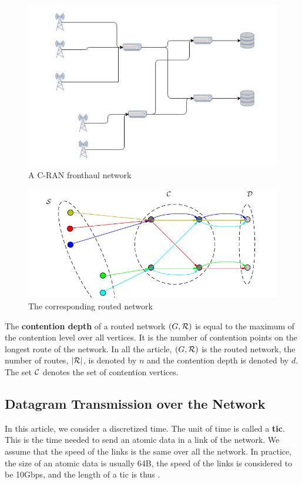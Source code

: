 \documentclass[english]{article}
\begin{document}
	\begin{figure}[h]
	\centering
	\includegraphics[scale=0.5]{fronthaul}
\caption{A C-RAN fronthaul network}
\label{fig:fronthaul}
\end{figure}
	\begin{figure}[h]
	\centering
	\includegraphics[scale=0.5]{graphmodel}
\caption{The corresponding routed network }
\label{fig:graph}
\end{figure}
	The  \textbf{contention depth} of a routed network $(G,{\cal R})$ is equal to the maximum of the contention level over all vertices. It is the number of contention points on the longest route of the network. In all the article, $(G,{\cal R})$ is the routed network, the number of routes, $|\cal{R}|$, is denoted by $n$ and the contention depth is denoted by $d$. The set ${\cal C}$ denotes the set of contention vertices.


 \subsection{Datagram Transmission over the Network}
	    
 		In this article, we consider a discretized time. The unit of time is called a {\bf tic}. This is the time needed to send an atomic data in a link of the network. We assume that the speed of the links is the same over all the network. In practice, the size of an atomic data is usually 64B, the speed of the links is considered to be 10Gbps, and the length of a tic is thus  .
\end{document}
